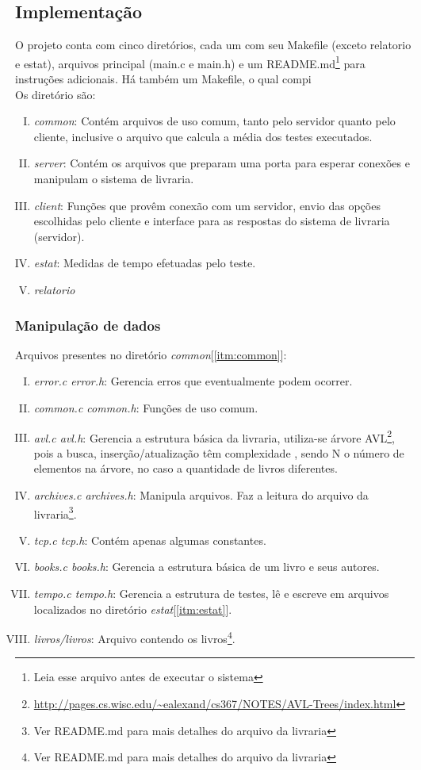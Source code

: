 \documentclass[a4paper,10pt]{article}
\begin{document}
\subsection{Implementação}
O projeto conta com cinco diretórios, cada um com seu Makefile (exceto relatorio e estat), arquivos
principal (main.c e main.h) e um README.md\footnote{Leia esse arquivo antes de
executar o sistema} para instruções adicionais. Há também um Makefile, o qual 
compi
\\Os diretório são:
\begin{enumerate}[I.]
\label{sec:dirs}
\item \label{itm:common} \emph{common}: Contém arquivos de uso comum, tanto pelo servidor quanto 
pelo cliente, inclusive o arquivo que calcula a média dos testes executados.
\item \label{itm:server} \emph{server}: Contém os arquivos que preparam uma porta para esperar
conexões e manipulam o sistema de livraria.
\item \label{itm:client} \emph{client}: Funções que provêm conexão com um servidor, envio das opções
escolhidas pelo cliente e interface para as respostas do sistema de livraria
(servidor).
\item \label{itm:estat} \emph{estat}: Medidas de tempo efetuadas pelo teste.
\item \label{itm:relatorio} \emph{relatorio}
\end{enumerate}
\subsubsection{Manipulação de dados}
Arquivos presentes no diretório \emph{common}[\ref{itm:common}]:
\begin{enumerate}[I.]
\item \emph{error.c error.h}: Gerencia erros que eventualmente podem ocorrer.
\item \emph{common.c common.h}: Funções de uso comum.
\item \label{itm:avl} \emph{avl.c avl.h}: Gerencia a estrutura básica da livraria, utiliza-se 
árvore AVL\footnote{ \url{http://pages.cs.wisc.edu/~ealexand/cs367/NOTES/AVL-Trees/index.html} }, pois a busca, inserção/atualização têm complexidade  , sendo N
o número de elementos na árvore, no caso a quantidade de livros diferentes.
\item \emph{archives.c archives.h}: Manipula arquivos. Faz a leitura do arquivo
da livraria\footnote{Ver README.md para mais detalhes do arquivo da livraria}.
\item \emph{tcp.c tcp.h}: Contém apenas algumas constantes.
\item \emph{books.c books.h}: Gerencia a estrutura básica de um livro e seus autores.
\item \label{itm:tempo}\emph{tempo.c tempo.h}: Gerencia a estrutura de testes, lê e escreve em arquivos localizados no diretório \emph{estat}[\ref{itm:estat}].
\item \emph{livros/livros}: Arquivo contendo os livros\footnote{Ver README.md para mais detalhes do arquivo da livraria}.
\end{enumerate}
\end{document}
